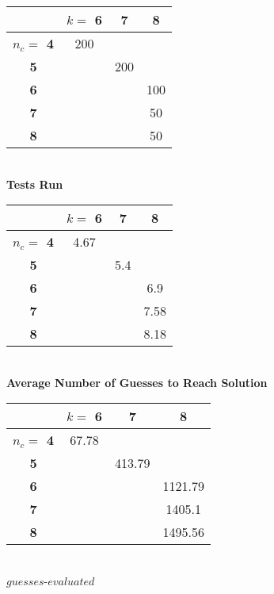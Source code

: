 \documentclass[11pt,twocolumn]{article}
\begin{document}
\begin{center}
\begin{tabular}{|c|c|c|c|}
\hline
        &\bf $k= $ 6 &\bf 7 &\bf 8 \\
\hline
\bf $n_c = $ 4 & 200   &   &   \\
\hline
\bf 5       &       &200&   \\
\hline
\bf 6       &       &   &100 \\
\hline
\bf 7       &       &   &50 \\
\hline
\bf 8       &       &   &50 \\
\hline
\end{tabular}\\
\bf Tests Run\rm\\
\end{center}

\begin{center}
\begin{tabular}{|c|c|c|c|}
\hline
        &\bf  $k= $ 6 &\bf 7 &\bf 8 \\
\hline
\bf $n_c = $ 4 & 4.67  &   &   \\
\hline
\bf 5       &       &5.4&   \\
\hline
\bf 6       &       &   &6.9 \\
\hline
\bf 7       &       &   &7.58 \\
\hline
\bf 8       &       &   &8.18 \\
\hline
\end{tabular}\\
\bf Average Number of Guesses to Reach Solution \rm\\
\vspace{.7cm}

\begin{tabular}{|c|c|c|c|}
\hline
        &\bf $k= $ 6 &\bf 7 &\bf 8 \\
\hline
\bf $n_c = $ 4 & 67.78   &   &   \\
\hline
\bf 5       &       & 413.79  &   \\
\hline
\bf 6       &       &   & 1121.79 \\
\hline
\bf 7       &       &   & 1405.1 \\
\hline
\bf 8       &       &   & 1495.56 \\
\hline
\end{tabular}\\
$guesses$-$evaluated$
\end{center}
\end{document}
